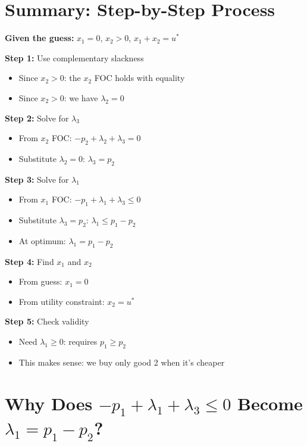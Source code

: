 \documentclass[11pt]{article}
\begin{document}
\section{Summary: Step-by-Step Process}

\begin{tcolorbox}[colback=blue!5!white,colframe=blue!75!black,title=How to Solve Problem 2b]

\textbf{Given the guess:} $x_1 = 0$, $x_2 > 0$, $x_1 + x_2 = u^*$

\textbf{Step 1:} Use complementary slackness
\begin{itemize}
\item Since $x_2 > 0$: the $x_2$ FOC holds with equality
\item Since $x_2 > 0$: we have $\lambda_2 = 0$
\end{itemize}

\textbf{Step 2:} Solve for $\lambda_3$
\begin{itemize}
\item From $x_2$ FOC: $-p_2 + \lambda_2 + \lambda_3 = 0$
\item Substitute $\lambda_2 = 0$: $\lambda_3 = p_2$
\end{itemize}

\textbf{Step 3:} Solve for $\lambda_1$
\begin{itemize}
\item From $x_1$ FOC: $-p_1 + \lambda_1 + \lambda_3 \leq 0$
\item Substitute $\lambda_3 = p_2$: $\lambda_1 \leq p_1 - p_2$
\item At optimum: $\lambda_1 = p_1 - p_2$
\end{itemize}

\textbf{Step 4:} Find $x_1$ and $x_2$
\begin{itemize}
\item From guess: $x_1 = 0$
\item From utility constraint: $x_2 = u^*$
\end{itemize}

\textbf{Step 5:} Check validity
\begin{itemize}
\item Need $\lambda_1 \geq 0$: requires $p_1 \geq p_2$
\item This makes sense: we buy only good 2 when it's cheaper
\end{itemize}

\end{tcolorbox}

\section{Why Does $-p_1 + \lambda_1 + \lambda_3 \leq 0$ Become $\lambda_1 = p_1 - p_2$?}
\end{document}
